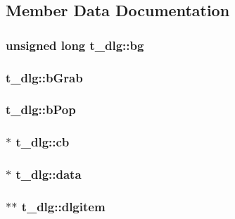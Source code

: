\subsection{\-Member \-Data \-Documentation}
\hypertarget{structt__dlg_a19eebadc7718653c5b31204f13674983}{
\subsubsection[{bg}]{\setlength{\rightskip}{0pt plus 5cm}unsigned long {\bf t\-\_\-dlg\-::bg}}}\label{structt__dlg_a19eebadc7718653c5b31204f13674983}
\hypertarget{structt__dlg_a56b2122da21748abc3dce72f4feedb8b}{
\subsubsection[{b\-Grab}]{ {\bf t\-\_\-dlg\-::b\-Grab}}}\label{structt__dlg_a56b2122da21748abc3dce72f4feedb8b}
\hypertarget{structt__dlg_a4fe984d272ac798c17630e4567d1e1f1}{
\subsubsection[{b\-Pop}]{ {\bf t\-\_\-dlg\-::b\-Pop}}}\label{structt__dlg_a4fe984d272ac798c17630e4567d1e1f1}
\hypertarget{structt__dlg_af4774638780f7d8ed0ee3bb14063495b}{
\subsubsection[{cb}]{$\ast$ {\bf t\-\_\-dlg\-::cb}}}\label{structt__dlg_af4774638780f7d8ed0ee3bb14063495b}
\hypertarget{structt__dlg_abe41aef51e7662eab5f67318461e3949}{
\subsubsection[{data}]{$\ast$ {\bf t\-\_\-dlg\-::data}}}\label{structt__dlg_abe41aef51e7662eab5f67318461e3949}
\hypertarget{structt__dlg_a3cff6051619f04378f149ad5a10b2f6a}{
\subsubsection[{dlgitem}]{$\ast$$\ast$ {\bf t\-\_\-dlg\-::dlgitem}}}\label{structt__dlg_a3cff6051619f04378f149ad5a10b2f6a}
